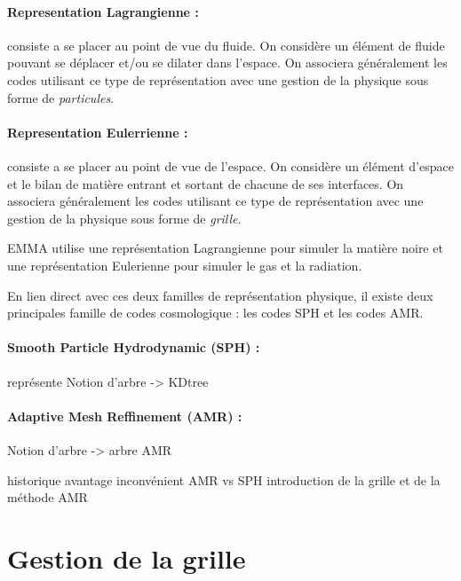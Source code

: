 \paragraph{Representation Lagrangienne : } 
consiste a se placer au point de vue du fluide.
On considère un élément de fluide pouvant se déplacer et/ou se dilater dans l'espace.
On associera généralement les codes utilisant ce type de représentation avec une gestion de la physique sous forme de \emph{particules}.

\paragraph{Representation Eulerrienne : } 
consiste a se placer au point de vue de l'espace.
On considère un élément d'espace et le bilan de matière entrant et sortant de chacune de ses interfaces.
On associera généralement les codes utilisant ce type de représentation avec une gestion de la physique sous forme de \emph{grille}.

EMMA utilise une représentation Lagrangienne pour simuler la matière noire et une représentation Eulerienne pour simuler le gas et la radiation.

En lien direct avec ces deux familles de représentation physique, il existe deux principales famille de codes cosmologique : les codes \ac{SPH} et les codes \ac{AMR}.



\paragraph{Smooth Particle Hydrodynamic (SPH) : } représente 
Notion d'arbre -> KDtree

\paragraph{Adaptive Mesh Reffinement (AMR) :  }
Notion d'arbre -> arbre AMR



historique
avantage inconvénient AMR vs SPH
introduction de la grille et de la méthode AMR

\section{Gestion de la grille}

